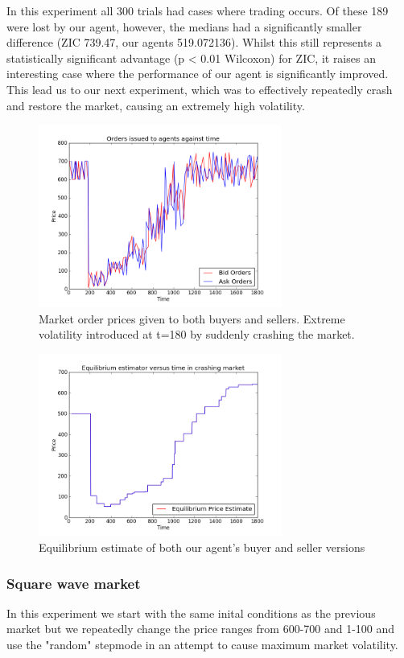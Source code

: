 \documentclass{acm_proc_article-sp}
\begin{document}
In this experiment all 300 trials had cases where trading occurs. Of these 189
were lost by our agent, however, the medians had a significantly smaller
difference (ZIC 739.47, our agents 519.072136). Whilst this still represents a
statistically significant advantage (p < 0.01 Wilcoxon) for ZIC, it raises an
interesting case where the performance of our agent is significantly improved.
This lead us to our next experiment, which was to effectively repeatedly crash
and restore the market, causing an extremely high volatility.

\begin{figure}[h!] \includegraphics[width=80mm]{crash.png} \caption{Market
order prices given to both buyers and sellers. Extreme volatility introduced at
t=180 by suddenly crashing the market.} \end{figure}

\begin{figure}[h!]
\includegraphics[width=80mm]{crash2.png} \caption{Equilibrium estimate of both
our agent's buyer and seller versions} \end{figure}

\subsubsection{Square wave market}

In this experiment we start with the same inital conditions as the previous
market but we repeatedly change the price ranges from 600-700 and 1-100 and use
the "random" stepmode in an attempt to cause maximum market volatility.
\end{document}
